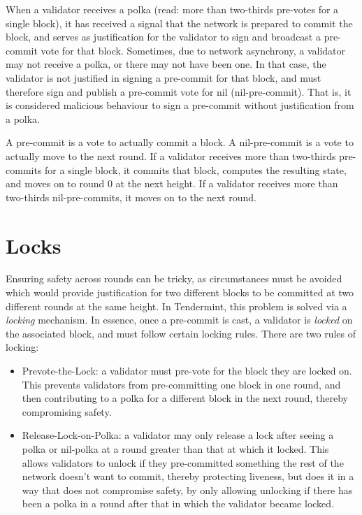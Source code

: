 When a validator receives a polka (read: more than two-thirds pre-votes for a single block), 
it has received a signal that the network is prepared to commit the block,
and serves as justification for the validator to sign and broadcast a pre-commit vote for that block.
Sometimes, due to network asynchrony, a validator may not receive a polka, or there may not have been one. 
In that case, the validator is not justified in signing a pre-commit for that block, 
and must therefore sign and publish a pre-commit vote for nil (nil-pre-commit).
That is, it is considered malicious behaviour to sign a pre-commit without justification from a polka.

A pre-commit is a vote to actually commit a block.
A nil-pre-commit is a vote to actually move to the next round.
If a validator receives more than two-thirds pre-commits for a single block, 
it commits that block, computes the resulting state,
and moves on to round 0 at the next height.
If a validator receives more than two-thirds nil-pre-commits,
it moves on to the next round.

\section{Locks}

Ensuring safety across rounds can be tricky, 
as circumstances must be avoided which would provide justification for two different blocks to be committed at two different rounds at the same height.
In Tendermint, this problem is solved via a \emph{locking} mechanism.
In essence, once a pre-commit is cast, a validator is \emph{locked} on the associated block, and must follow certain locking rules.
There are two rules of locking:

\begin{itemize}
\item{Prevote-the-Lock: a validator must pre-vote for the block they are locked on. 
	This prevents validators from pre-committing one block in one round, 
	and then contributing to a polka for a different block in the next round, 
	thereby compromising safety.}
\item{Release-Lock-on-Polka: a validator may only release a lock after seeing a polka or nil-polka at a round greater than that at which it locked.
	This allows validators to unlock if they pre-committed something the rest of the network doesn't want to commit,
	thereby protecting liveness, but does it in a way that does not compromise safety,
	by only allowing unlocking if there has been a polka in a round after that in which the validator became locked.}
\end{itemize}


